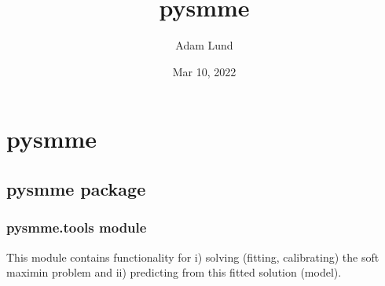 \documentclass[letterpaper,10pt,english]{sphinxmanual}
\title{pysmme}
\date{Mar 10, 2022}
\author{Adam Lund}
\begin{document}
\pagestyle{empty}
\sphinxmaketitle
\pagestyle{plain}
\sphinxtableofcontents
\pagestyle{normal}
\label{\detokenize{index::doc}}



\chapter{pysmme}
\label{\detokenize{modules:pysmme}}\label{\detokenize{modules::doc}}

\section{pysmme package}
\label{\detokenize{pysmme:pysmme-package}}\label{\detokenize{pysmme::doc}}

\subsection{pysmme.tools module}
\label{\detokenize{pysmme:module-pysmme.tools}}\label{\detokenize{pysmme:pysmme-tools-module}}
\sphinxAtStartPar
This module contains functionality for i) solving (fitting, calibrating) the soft maximin problem 
and ii) predicting from this fitted solution (model).
\end{document}

